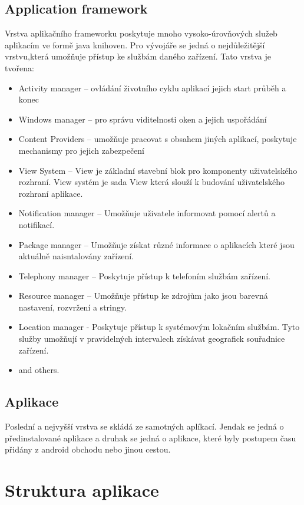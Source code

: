 \subsection{Application framework}
Vrstva aplikačního frameworku poskytuje mnoho vysoko-úrovňových služeb aplikacím ve formě java knihoven. Pro vývojáře se jedná o nejdůležitější vrstvu,která umožňuje přístup ke službám daného zařízení. Tato vrstva je tvořena: 
\begin{itemize} %
\item Activity manager -- ovládání životního cyklu aplikací jejich start průběh a konec
\item Windows manager -- pro správu viditelnosti oken a jejich uspořádání
\item Content Providers -- umožňuje pracovat s obsahem jiných aplikací, poskytuje mechanismy pro jejich zabezpečení 
\item View System -- View je základní stavební blok pro komponenty uživatelského rozhraní. View systém je sada View která slouží k budování uživatelského rozhraní aplikace.
\item Notification manager -- Umožňuje uživatele informovat pomocí alertů a notifikací.
\item Package manager -- Umožňuje získat různé informace o aplikacích které jsou aktuálně naisntalovány  zařízení.
\item Telephony manager -- Poskytuje přístup k telefoním službám zařízení. 
\item Resource manager -- Umožňuje přístup ke zdrojům jako jsou barevná nastavení, rozvržení a stringy.
\item Location manager - Poskytuje přístup k systémovým lokačním službám. Tyto služby umožňují v pravidelných intervalech získávat geografick souřadnice zařízení.
\item and others.
\end{itemize}

\subsection{Aplikace}
Poslední a nejvyšší vrstva se skládá ze samotných aplíkací. Jendak se jedná o předinstalované aplikace a druhak se jedná o aplikace, které byly postupem času přidány z android obchodu nebo jinou cestou.




\section{Struktura aplikace}
